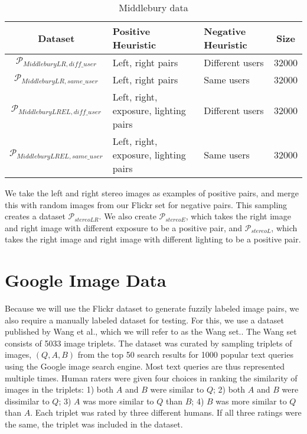 \begin{table}
	\centering
	\begin{tabular}{c >{\centering\arraybackslash}m{3.2cm} >{\centering\arraybackslash}m{3cm} c}
		\toprule
		\bfseries{Dataset} &  \bfseries Positive Heuristic & \bfseries Negative Heuristic & \bfseries{Size}\\
		\midrule
		$\mathcal{P}_{MiddleburyLR,diff\_user}$ & Left, right pairs & Different users  & 32000\\
		$\mathcal{P}_{MiddleburyLR,same\_user}$ & Left, right pairs& Same users  & 32000\\
		$\mathcal{P}_{MiddleburyLREL,diff\_user}$ & Left, right, exposure, lighting pairs  & Different users  & 32000\\
		$\mathcal{P}_{MiddleburyLREL,same\_user}$ & Left, right, exposure, lighting pairs  & Same users  & 32000\\
	\end{tabular}
	\caption{Middlebury data}
	\label{table:middlebury}
\end{table}
We take the left and right stereo images as examples of positive pairs, and merge this with random images from our Flickr set for negative pairs. This sampling creates a dataset $\mathcal{P}_{stereoLR}$. We also create $\mathcal{P}_{stereoE}$, which takes the right image and right image with different exposure to be a positive pair, and $\mathcal{P}_{stereoL}$, which takes the right image and right image with different lighting to be a positive pair.


\section{Google Image Data}
Because we will use the Flickr dataset to generate fuzzily labeled image pairs, we also require a manually labeled dataset for testing. For this, we use a dataset published by Wang et al., which we will refer to as the Wang set.\cite{wang2014learning}. 
The Wang set consists of 5033 image triplets. The dataset was curated by sampling triplets of images, $(Q, A, B)$ from the top 50 search results for 1000 popular text queries using the Google image search engine. Most text queries are thus represented multiple times. Human raters were given four choices in ranking the similarity of images in the triplets: 1) both $A$ and $B$ were similar to $Q$; 2) both $A$ and $B$ were dissimilar to $Q$; 3) $A$ was more similar to $Q$ than $B$; 4) $B$ was more similar to $Q$ than $A$. Each triplet was rated by three different humans. If all three ratings were the same, the triplet was included in the dataset.

